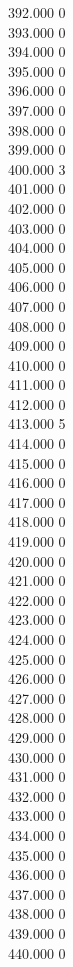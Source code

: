 { 392.000	0 \\
 393.000	0 \\
 394.000	0 \\
 395.000	0 \\
 396.000	0 \\
 397.000	0 \\
 398.000	0 \\
 399.000	0 \\
 400.000	3 \\
 401.000	0 \\
 402.000	0 \\
 403.000	0 \\
 404.000	0 \\
 405.000	0 \\
 406.000	0 \\
 407.000	0 \\
 408.000	0 \\
 409.000	0 \\
 410.000	0 \\
 411.000	0 \\
 412.000	0 \\
 413.000	5 \\
 414.000	0 \\
 415.000	0 \\
 416.000	0 \\
 417.000	0 \\
 418.000	0 \\
 419.000	0 \\
 420.000	0 \\
 421.000	0 \\
 422.000	0 \\
 423.000	0 \\
 424.000	0 \\
 425.000	0 \\
 426.000	0 \\
 427.000	0 \\
 428.000	0 \\
 429.000	0 \\
 430.000	0 \\
 431.000	0 \\
 432.000	0 \\
 433.000	0 \\
 434.000	0 \\
 435.000	0 \\
 436.000	0 \\
 437.000	0 \\
 438.000	0 \\
 439.000	0 \\
 440.000	0 \\
}
